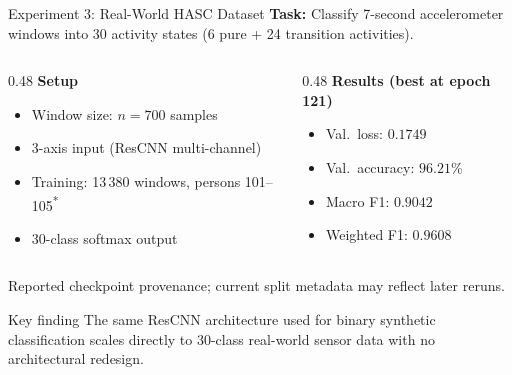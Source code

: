\documentclass[8.5pt]{beamer}
\begin{document}
\begin{frame}{Experiment 3: Real-World HASC Dataset \cite{hasc2011}}
  \textbf{Task:} Classify 7-second accelerometer windows into 30 activity states
  (6 pure + 24 transition activities).

  \bigskip
  \begin{columns}[T]
    \begin{column}{0.48\textwidth}
      \textbf{Setup}
      \begin{itemize}
        \item Window size: $n = 700$ samples
        \item 3-axis input (ResCNN multi-channel)
        \item Training: 13\,380 windows, persons 101–105\textsuperscript{*}
        \item 30-class softmax output
      \end{itemize}
    \end{column}
    \begin{column}{0.48\textwidth}
      \textbf{Results (best at epoch 121)}
      \begin{itemize}
        \item Val.\ loss: $0.1749$
        \item Val.\ accuracy: $\mathbf{96.21\%}$
        \item Macro F1: $0.9042$
        \item Weighted F1: $0.9608$
      \end{itemize}
    \end{column}
  \end{columns}

  \medskip
  {\scriptsize *Reported checkpoint provenance; current split metadata may reflect later reruns.}

  \medskip
  \begin{block}{Key finding}
    The same ResCNN architecture used for binary synthetic classification scales
    directly to 30-class real-world sensor data with no architectural redesign.
  \end{block}
\end{frame}
\end{document}
